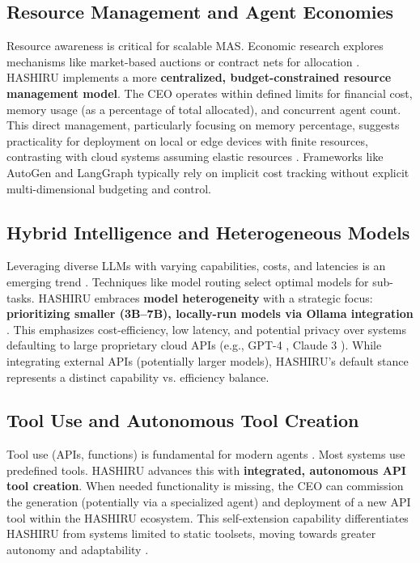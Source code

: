\documentclass[conference]{IEEEtran}
\begin{document}
\subsection{Resource Management and Agent Economies}
Resource awareness is critical for scalable MAS. Economic research explores mechanisms like market-based auctions or contract nets for allocation \cite{clearwater1996market}. HASHIRU implements a more \textbf{centralized, budget-constrained resource management model}. The CEO operates within defined limits for financial cost, memory usage (as a percentage of total allocated), and concurrent agent count. This direct management, particularly focusing on memory percentage, suggests practicality for deployment on local or edge devices with finite resources, contrasting with cloud systems assuming elastic resources \cite{park2023generative}. Frameworks like AutoGen \cite{wu2023autogen} and LangGraph \cite{langgraph} typically rely on implicit cost tracking without explicit multi-dimensional budgeting and control.

\subsection{Hybrid Intelligence and Heterogeneous Models}
Leveraging diverse LLMs with varying capabilities, costs, and latencies is an emerging trend \cite{zhou2023agents}. Techniques like model routing select optimal models for sub-tasks. HASHIRU embraces \textbf{model heterogeneity} with a strategic focus: \textbf{prioritizing smaller (3B--7B), locally-run models via Ollama integration} \cite{ollama}. This emphasizes cost-efficiency, low latency, and potential privacy over systems defaulting to large proprietary cloud APIs (e.g., GPT-4 \cite{openai2023gpt4}, Claude 3 \cite{anthropic2024claude}). While integrating external APIs (potentially larger models), HASHIRU's default stance represents a distinct capability vs. efficiency balance.

\subsection{Tool Use and Autonomous Tool Creation}
Tool use (APIs, functions) is fundamental for modern agents \cite{yao2022react, openai_func_calling}. Most systems use predefined tools. HASHIRU advances this with \textbf{integrated, autonomous API tool creation}. When needed functionality is missing, the CEO can commission the generation (potentially via a specialized agent) and deployment of a new API tool within the HASHIRU ecosystem. This self-extension capability differentiates HASHIRU from systems limited to static toolsets, moving towards greater autonomy and adaptability \cite{wang2023voyager, park2023generative}.
\end{document}
